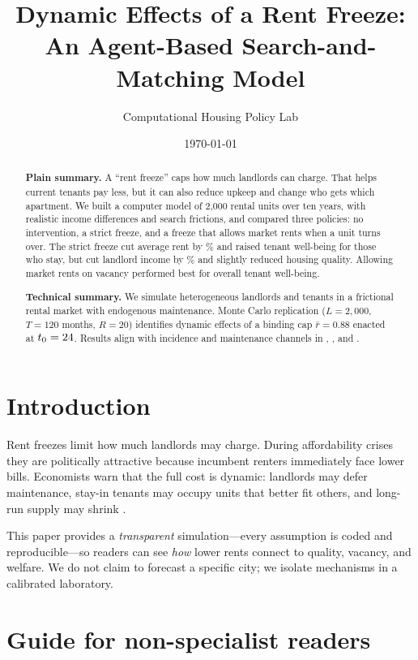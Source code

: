 \documentclass[11pt,a4paper]{article}
\title{Dynamic Effects of a Rent Freeze:\\
An Agent-Based Search-and-Matching Model}
\author{Computational Housing Policy Lab}
\date{\today}
\begin{document}
\maketitle

\begin{abstract}
\noindent\textbf{Plain summary.} A ``rent freeze'' caps how much landlords can charge. That helps current tenants pay less, but it can also reduce upkeep and change who gets which apartment. We built a computer model of 2{,}000 rental units over ten years, with realistic income differences and search frictions, and compared three policies: no intervention, a strict freeze, and a freeze that allows market rents when a unit turns over. The strict freeze cut average rent by \SimRentDropPct\% and raised tenant well-being for those who stay, but cut landlord income by \SimProfitDropPct\% and slightly reduced housing quality. Allowing market rents on vacancy performed best for overall tenant well-being.

\medskip
\noindent\textbf{Technical summary.} We simulate heterogeneous landlords and tenants in a frictional rental market with endogenous maintenance. Monte Carlo replication ($L=2{,}000$, $T=120$ months, $R=20$) identifies dynamic effects of a binding cap $\bar r=0.88$ enacted at $t_0=24$. Results align with incidence and maintenance channels in \citet{glaeser2003}, \citet{sims2011}, and \citet{diamond2019}.
\end{abstract}

\section{Introduction}

Rent freezes limit how much landlords may charge. During affordability crises they are politically attractive because incumbent renters immediately face lower bills. Economists warn that the full cost is dynamic: landlords may defer maintenance, stay-in tenants may occupy units that better fit others, and long-run supply may shrink \citep{arnott1995, glaeser2003, diamond2019}.

This paper provides a \emph{transparent} simulation---every assumption is coded and reproducible---so readers can see \emph{how} lower rents connect to quality, vacancy, and welfare. We do not claim to forecast a specific city; we isolate mechanisms in a calibrated laboratory.

\section{Guide for non-specialist readers}
\end{document}
